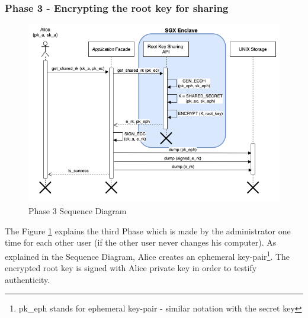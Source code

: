 \documentclass[../main.tex]{subfiles}
\begin{document}
\subsubsection{Phase 3 - Encrypting the root key for sharing}
\begin{figure}[ht]
    \centering
    \includegraphics[width=\textwidth]{../../images/lauxus/upload_rk}
    
    \caption{Phase 3 Sequence Diagram}
    \label{figure:lauxus:upload_rk}
\end{figure}
\par The Figure \ref{figure:lauxus:upload_rk} explains the third Phase which is made by the administrator one time for each other user (if the other user never changes his computer). As explained in the Sequence Diagram, Alice creates an ephemeral key-pair\footnote{pk\_eph stands for ephemeral key-pair - similar notation with the secret key}. The encrypted root key is signed with Alice private key in order to testify authenticity.
\end{document}
